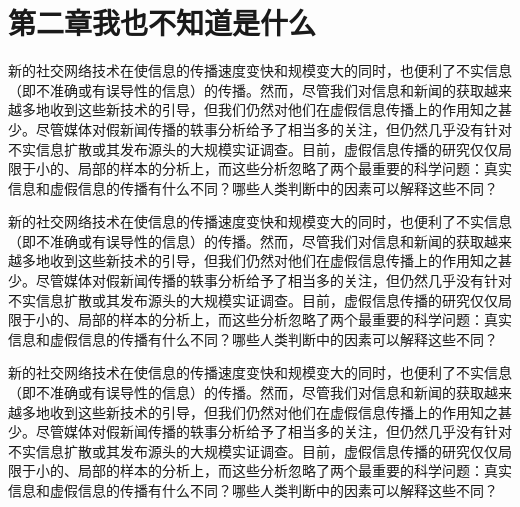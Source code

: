 \documentclass[a4paper,AutoFakeBold,oneside,12pt]{book}
\begin{document}
\chapter*{第二章\quad{}我也不知道是什么}
\thispagestyle{empty}

新的社交网络技术在使信息的传播速度变快和规模变大的同时，也便利了不实信息（即不准确或有误导性的信息）的传播。然而，尽管我们对信息和新闻的获取越来越多地收到这些新技术的引导，但我们仍然对他们在虚假信息传播上的作用知之甚少。尽管媒体对假新闻传播的轶事分析给予了相当多的关注，但仍然几乎没有针对不实信息扩散或其发布源头的大规模实证调查。目前，虚假信息传播的研究仅仅局限于小的、局部的样本的分析上，而这些分析忽略了两个最重要的科学问题：真实信息和虚假信息的传播有什么不同？哪些人类判断中的因素可以解释这些不同？

新的社交网络技术在使信息的传播速度变快和规模变大的同时，也便利了不实信息（即不准确或有误导性的信息）的传播。然而，尽管我们对信息和新闻的获取越来越多地收到这些新技术的引导，但我们仍然对他们在虚假信息传播上的作用知之甚少。尽管媒体对假新闻传播的轶事分析给予了相当多的关注，但仍然几乎没有针对不实信息扩散或其发布源头的大规模实证调查。目前，虚假信息传播的研究仅仅局限于小的、局部的样本的分析上，而这些分析忽略了两个最重要的科学问题：真实信息和虚假信息的传播有什么不同？哪些人类判断中的因素可以解释这些不同？

新的社交网络技术在使信息的传播速度变快和规模变大的同时，也便利了不实信息（即不准确或有误导性的信息）的传播。然而，尽管我们对信息和新闻的获取越来越多地收到这些新技术的引导，但我们仍然对他们在虚假信息传播上的作用知之甚少。尽管媒体对假新闻传播的轶事分析给予了相当多的关注，但仍然几乎没有针对不实信息扩散或其发布源头的大规模实证调查。目前，虚假信息传播的研究仅仅局限于小的、局部的样本的分析上，而这些分析忽略了两个最重要的科学问题：真实信息和虚假信息的传播有什么不同？哪些人类判断中的因素可以解释这些不同？



\thispagestyle{empty}
\begin{center}


\end{center}

 


 
\end{document}
